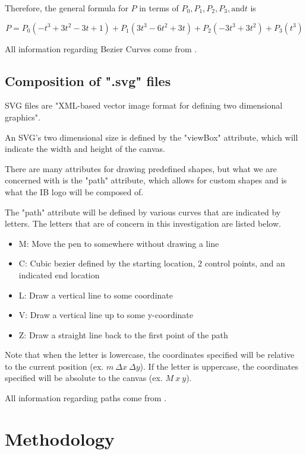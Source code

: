 \documentclass[letterpaper, 12pt]{article}
\begin{document}
Therefore, the general formula for \(P\) in terms of
\(P_0, P_1, P_2, P_3, \text{and} t\) is

\begin{equation}
    P = P_0(-t^3+3t^2-3t+1) + P_1(3t^3-6t^2+3t) + P_2(-3t^3+3t^2) + P_3(t^3)
\end{equation}

All information regarding Bezier Curves come from \cite{holmerBeautyBezierCurves2021}.

\subsection{Composition of ".svg" files}

SVG files are "XML-based vector image format for defining two dimensional
graphics"\cite{SVG2023}.

An SVG's two dimensional size is defined by the "viewBox" attribute,
which will indicate the width and height of the canvas.

There are many attributes for drawing predefined shapes, but what
we are concerned with is the "path" attribute, which allows for custom
shapes and is what the IB logo will be composed of.

The "path" attribute will be defined by various curves that are indicated
by letters. The letters that are of concern in this investigation are
listed below.
\begin{itemize}
    \item M: Move the pen to somewhere without drawing a line
    \item C: Cubic bezier defined by the starting location, 2 control points, and an indicated end location
    \item L: Draw a vertical line to some coordinate
    \item V: Draw a vertical line up to some y-coordinate
    \item Z: Draw a straight line back to the first point of the path
\end{itemize}

Note that when the letter is lowercase, the coordinates specified will
be relative to the current position (ex. \(m~\Delta x~\Delta y\)). If the letter is uppercase, the
coordinates specified will be absolute to the canvas (ex. \(M~x~y\)).

All information regarding paths come from \cite{mozilladevelopernetworkPathsSVGScalable2023}.




\section{Methodology}
\end{document}
